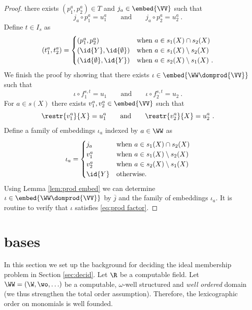 \begin{proof}
there exists $(p^a_1,p^a_2)\in T$ and $j_a \in \embed{\VV}$ such that
\[
j_a \circ p^a_1 = u^a_1
\qquad \text{and} \qquad
j_a \circ p^a_2 = u^a_2 \ .
\]
Define $t \in I_s$ as
\[
(t^a_1,t^a_2) =
\begin{cases}
(p^a_1,p^a_2) & \text{when } a\in s_1(X)\cap s_2(X) \\
(\id{Y},\id{\emptyset}) & \text{when } a\in s_1(X)\setminus s_2(X) \\
(\id{\emptyset},\id{Y}) & \text{when } a\in s_2(X)\setminus s_1(X) \ .\\
\end{cases}
\]
We finish the proof by showing that there exists $\iota\in\embed{{\WW}\domprod{\VV}}$ such that
\begin{equation}\label{eq:prod factor}
\iota \circ f^{s,t}_1 = u_1
\qquad \text{and} \qquad
\iota \circ f^{s,t}_2 = u_2 \ .
\end{equation}
For $a\in s(X)$ there exists $v^a_1,v^a_2\in\embed{\VV}$ such that
\[
\restr{v^a_1}{X} = u^a_1
\qquad \text{and} \qquad
\restr{v^a_2}{X} = u^a_2 \ .
\]
Define a family of embeddings $\iota_a$ indexed by $a\in\WW$ as
\[
\iota_a =
\begin{cases}
j_a & \text{when } a\in s_1(X)\cap s_2(X) \\
v^a_1 & \text{when } a\in s_1(X)\setminus s_2(X) \\
v^a_2 & \text{when } a\in s_2(X)\setminus s_1(X) \\
\id{Y} & \text{otherwise.}
\end{cases}
\] 
Using Lemma \ref{lem:prod embed} we can determine $\iota\in\embed{{\WW}\domprod{\VV}}$ by $\overline{j}$ and the family of embeddings $\iota_a$.
It is routine to verify that $\iota$ satisfies \eqref{eq:prod factor}.
\end{proof}



\section{\Gr bases} \label{sec:Gr}

In this section we set up the background for deciding the ideal membership problem
in Section \ref{sec:decid}.
%
Let $\R$ be a  computable field. %
%
Let $\WW=(\W, \wo, \ldots)$ be a computable,
$\omega$-well structured and \emph{well ordered}  domain
(we thus strengthen the total order assumption).
Therefore, the lexicographic order on monomials is well founded.



